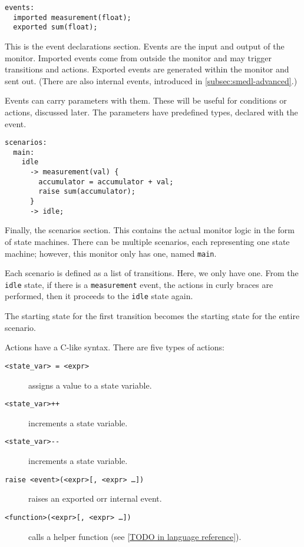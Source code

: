 \documentclass[paper=letter,titlepage,captions=tableheading]{scrartcl}
\begin{document}
\begin{lstlisting}[firstnumber=6,style=smedlfixed]
events:
  imported measurement(float);
  exported sum(float);
\end{lstlisting}

This is the event declarations section. Events are the input and output of the
monitor. Imported events come from outside the monitor and may trigger
transitions and actions. Exported events are generated within the monitor and
sent out. (There are also internal events, introduced in \autoref{subsec:smedl-advanced}.)

Events can carry parameters with them. These will be useful for conditions or
actions, discussed later. The parameters have predefined types, declared with
the event.

\begin{lstlisting}[firstnumber=10,style=smedlfixed]
scenarios:
  main:
    idle
      -> measurement(val) {
        accumulator = accumulator + val;
        raise sum(accumulator);
      }
      -> idle;
\end{lstlisting}

Finally, the scenarios section. This contains the actual monitor logic in the
form of state machines. There can be multiple scenarios, each representing one
state machine; however, this monitor only has one, named \texttt{main}.

Each scenario is defined as a list of transitions. Here, we only have one. From
the \texttt{idle} state, if there is a \texttt{measurement} event, the actions
in curly braces are performed, then it proceeds to the \texttt{idle} state
again.

The starting state for the first transition becomes the starting state for the
entire scenario.

Actions have a C-like syntax. There are five types of actions:
\begin{description}
  \item[\texttt{<state\_var> = <expr>}] assigns a value to a state
    variable.
  \item[\texttt{<state\_var>++}] increments a state variable.
  \item[\texttt{<state\_var>-{}-}] increments a state variable.
  \item[\texttt{raise <event>(<expr>[, <expr> \ldots])}] raises an exported orr
    internal event.
  \item[\texttt{<function>(<expr>[, <expr> \ldots])}] calls a helper function
    (see \autoref{TODO in language reference}).
\end{description}
\end{document}
